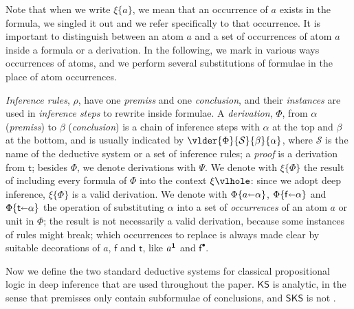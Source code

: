 \documentclass[a4paper]{LMCS}
\begin{document}
Note that when we write $\xi\{a\}$, we mean that an occurrence of $a$ exists in the formula, we singled it out and we refer specifically to that occurrence. It is important to distinguish between an atom $a$ and a set of occurrences of atom $a$ inside a formula or a derivation. In the following, we mark in various ways occurrences of atoms, and we perform several substitutions of formulae in the place of atom occurrences.

\begin{defi}
\emph{Inference rules}, $\rho$, have one \emph{premiss} and one \emph{conclusion}, and their \emph{instances} are used in \emph{inference steps} to rewrite inside formulae. A \emph{derivation}, $\Phi$, from $\alpha$ (\emph{premiss}) to $\beta$ (\emph{conclusion}) is a chain of inference steps with $\alpha$ at the top and $\beta$ at the bottom, and is usually indicated by $\vlder{\Phi}{\mathcal S}{\beta}{\alpha}$, where $\mathcal S$ is the name of the deductive system or a set of inference rules; a \emph{proof} is a derivation from ${\mathsf t}$; besides $\Phi$, we denote derivations with $\Psi$. We denote with $\xi\{\Phi\}$ the result of including every formula of $\Phi$ into the context $\xi\vlhole$: since we adopt deep inference, $\xi\{\Phi\}$ is a valid derivation. We denote with $\Phi\{a{\mathbin\shortleftarrow}\alpha\}$, $\Phi\{{\mathsf f}{\mathbin\shortleftarrow}\alpha\}$ and $\Phi\{{\mathsf t}{\mathbin\shortleftarrow} \alpha\}$ the operation of substituting $\alpha$ into a set of \emph{occurrences} of an atom $a$ or unit in $\Phi$; the result is not necessarily a valid derivation, because some instances of rules might break; which occurrences to replace is always made clear by suitable decorations of $a$, ${\mathsf f}$ and ${\mathsf t}$, like $a^{{\mathchoice{\scriptstyle\mathbf1}
                              {\scriptstyle\mathbf1}
                              {\scriptstyle\mathbf1}
                              {\scriptscriptstyle\mathbf1}}}$ and ${{{\mathsf f}}^{\scriptscriptstyle\bullet}}$.
\end{defi}

Now we define the two standard deductive systems for classical propositional logic in deep inference that are used throughout the paper. ${\mathsf{KS}}$ is analytic, in the sense that premisses only contain subformulae of conclusions, and ${\mathsf{SKS}}$ is not \cite{Brun:03:Atomic-C:oz,Brun:06:Cut-Elim:cq,Brun:06:Locality:zh,BrunTiu:01:A-Local-:mz}.
\end{document}
